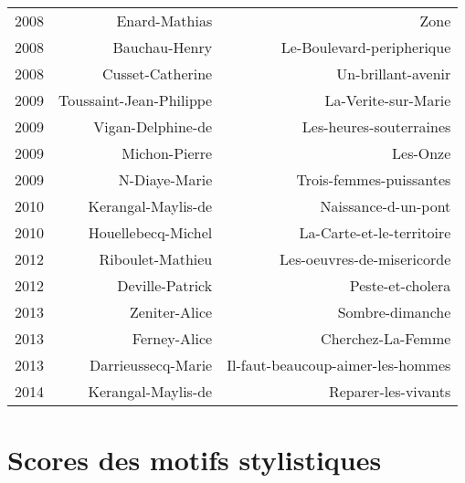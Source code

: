 \begin{xltabular}{\textwidth}{lrr}
2008 &                        Enard-Mathias &                                  Zone \\
2008 &                        Bauchau-Henry &             Le-Boulevard-peripherique \\
2008 &                     Cusset-Catherine &                    Un-brillant-avenir \\
2009 &              Toussaint-Jean-Philippe &                   La-Verite-sur-Marie \\
2009 &                    Vigan-Delphine-de &               Les-heures-souterraines \\
2009 &                        Michon-Pierre &                              Les-Onze \\
2009 &                        N-Diaye-Marie &               Trois-femmes-puissantes \\
2010 &                   Kerangal-Maylis-de &                   Naissance-d-un-pont \\
2010 &                   Houellebecq-Michel &             La-Carte-et-le-territoire \\
2012 &                     Riboulet-Mathieu &            Les-oeuvres-de-misericorde \\
2012 &                      Deville-Patrick &                      Peste-et-cholera \\
2013 &                        Zeniter-Alice &                       Sombre-dimanche \\
2013 &                         Ferney-Alice &                     Cherchez-La-Femme \\
2013 &                   Darrieussecq-Marie &     Il-faut-beaucoup-aimer-les-hommes \\
2014 &                   Kerangal-Maylis-de &                   Reparer-les-vivants \\
\bottomrule
\end{xltabular}


\newpage
\section{Scores des motifs stylistiques}\label{perf_motif}

